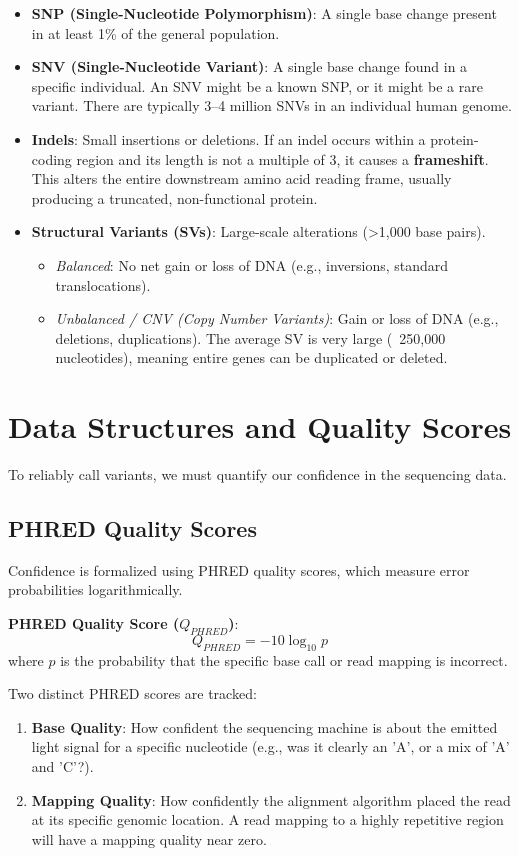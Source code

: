 \documentclass[11pt,a4paper]{article}
\newenvironment{important}{
    \vspace{1em}
    \begin{tcolorbox}[colback=blue!5!white, colframe=blue!75!black, boxrule=1pt, arc=4pt, left=10pt, right=10pt, top=10pt, bottom=10pt]
}{
    \end{tcolorbox}
    \vspace{1em}
}
\begin{document}
\begin{itemize}
    \item \textbf{SNP (Single-Nucleotide Polymorphism)}: A single base change present in at least 1\% of the general population.
    \item \textbf{SNV (Single-Nucleotide Variant)}: A single base change found in a specific individual. An SNV might be a known SNP, or it might be a rare variant. There are typically 3–4 million SNVs in an individual human genome.
    \item \textbf{Indels}: Small insertions or deletions. If an indel occurs within a protein-coding region and its length is not a multiple of 3, it causes a \textbf{frameshift}. This alters the entire downstream amino acid reading frame, usually producing a truncated, non-functional protein.
    \item \textbf{Structural Variants (SVs)}: Large-scale alterations (>1,000 base pairs). 
    \begin{itemize}
        \item \textit{Balanced}: No net gain or loss of DNA (e.g., inversions, standard translocations).
        \item \textit{Unbalanced / CNV (Copy Number Variants)}: Gain or loss of DNA (e.g., deletions, duplications). The average SV is very large (~250,000 nucleotides), meaning entire genes can be duplicated or deleted.
    \end{itemize}
\end{itemize}

\section{Data Structures and Quality Scores}
To reliably call variants, we must quantify our confidence in the sequencing data. 

\subsection{PHRED Quality Scores}
Confidence is formalized using PHRED quality scores, which measure error probabilities logarithmically.

\begin{important}
  \textbf{PHRED Quality Score (\(Q_{PHRED}\))}: 
  \[ Q_{PHRED} = -10 \log_{10} p \]
  where \( p \) is the probability that the specific base call or read mapping is incorrect.
\end{important}

Two distinct PHRED scores are tracked:
\begin{enumerate}
    \item \textbf{Base Quality}: How confident the sequencing machine is about the emitted light signal for a specific nucleotide (e.g., was it clearly an 'A', or a mix of 'A' and 'C'?).
    \item \textbf{Mapping Quality}: How confidently the alignment algorithm placed the read at its specific genomic location. A read mapping to a highly repetitive region will have a mapping quality near zero.
\end{enumerate}
\end{document}
